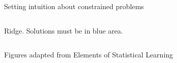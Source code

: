 \documentclass[mathserif, aspectratio=169]{beamer}
\begin{document}
\begin{frame}{Setting intuition about constrained problems}
\begin{columns}
\begin{center}
Ridge.  Solutions must be in blue area.
\end{center}

\end{columns}

{\tiny Figures adapted from Elements of Statistical Learning}

\end{frame}
\end{document}

